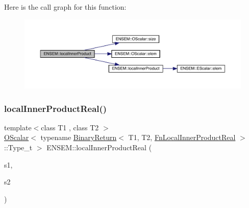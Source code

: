 Here is the call graph for this function\+:\nopagebreak
\begin{figure}[H]
\begin{center}
\leavevmode
\includegraphics[width=350pt]{da/d59/group__obsvector_gad915d71f08c700574f01f93a9689eb82_cgraph}
\end{center}
\end{figure}
\mbox{\label{group__obsvector_ga1a740c7927429957c8bc0b75d070bb71}} 
\subsubsection{\texorpdfstring{localInnerProductReal()}{localInnerProductReal()}}
{\footnotesize\ttfamily template$<$class T1 , class T2 $>$ \\
\mbox{\hyperlink{classENSEM_1_1OScalar}{O\+Scalar}}$<$ typename \mbox{\hyperlink{structENSEM_1_1BinaryReturn}{Binary\+Return}}$<$ T1, T2, \mbox{\hyperlink{structENSEM_1_1FnLocalInnerProductReal}{Fn\+Local\+Inner\+Product\+Real}} $>$\+::Type\+\_\+t $>$ E\+N\+S\+E\+M\+::local\+Inner\+Product\+Real (\begin{DoxyParamCaption}\item[{const \mbox{\hyperlink{classENSEM_1_1OVector}{O\+Vector}}$<$ T1 $>$ \&}]{s1,  }\item[{const \mbox{\hyperlink{classENSEM_1_1OVector}{O\+Vector}}$<$ T2 $>$ \&}]{s2 }\end{DoxyParamCaption})\hspace{0.3cm}{\ttfamily [inline]}}

